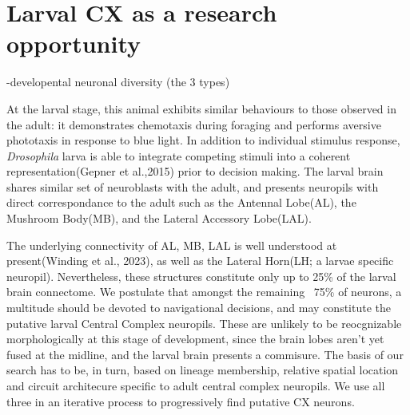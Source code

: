 \section{Larval CX as a research opportunity}
    -developental neuronal diversity (the 3 types)

    At the larval stage, this animal exhibits  similar behaviours to those observed in the adult: it demonstrates chemotaxis during foraging and performs aversive phototaxis in response to blue light. In addition to individual stimulus response, \textit{Drosophila} larva is able to integrate competing stimuli into a coherent representation(Gepner et al.,2015) prior to decision making. The larval brain shares similar set of neuroblasts with the adult, and presents neuropils with direct correspondance to the adult such as the Antennal Lobe(AL), the Mushroom Body(MB), and the Lateral Accessory Lobe(LAL). 

    The underlying connectivity of AL, MB, LAL is well understood at present(Winding et al., 2023), as well as the Lateral Horn(LH; a larvae specific neuropil). Nevertheless, these structures constitute only up to 25\% of the larval brain connectome. We postulate that amongst the remaining ~75\% of neurons, a multitude should be devoted to navigational decisions, and may constitute the putative larval Central Complex neuropils. These are unlikely to be reocgnizable morphologically at this stage of development, since the brain lobes aren't yet fused at the midline, and the larval brain presents a commisure. The basis of our search has to be, in turn, based on lineage membership, relative spatial location and circuit architecure specific to adult central complex neuropils. We use all three in an iterative process to progressively find putative CX neurons.


